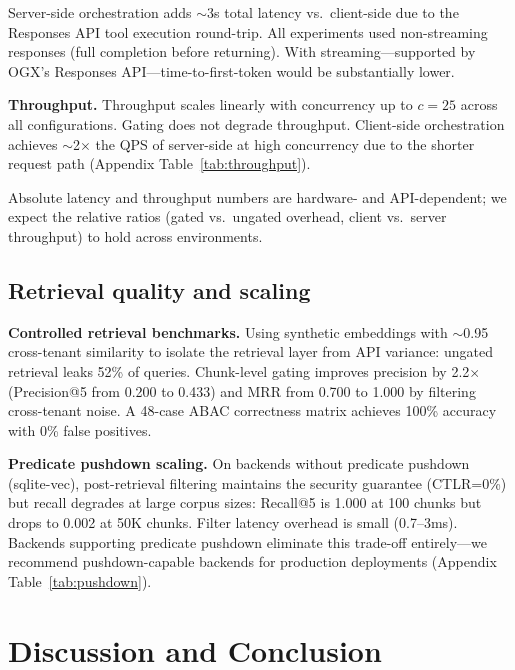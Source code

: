 \documentclass[sigconf]{acmart}
\begin{document}
Server-side orchestration adds ${\sim}$3s total latency vs.\ client-side due to the Responses API tool execution round-trip. All experiments used non-streaming responses (full completion before returning). With streaming---supported by OGX's Responses API---time-to-first-token would be substantially lower.

\textbf{Throughput.} Throughput scales linearly with concurrency up to $c{=}25$ across all configurations. Gating does not degrade throughput. Client-side orchestration achieves ${\sim}$2$\times$ the QPS of server-side at high concurrency due to the shorter request path (Appendix Table~\ref{tab:throughput}).

Absolute latency and throughput numbers are hardware- and API-dependent; we expect the relative ratios (gated vs.\ ungated overhead, client vs.\ server throughput) to hold across environments.

\subsection{Retrieval quality and scaling}

\textbf{Controlled retrieval benchmarks.} Using synthetic embeddings with ${\sim}$0.95 cross-tenant similarity to isolate the retrieval layer from API variance: ungated retrieval leaks 52\% of queries. Chunk-level gating improves precision by 2.2$\times$ (Precision@5 from 0.200 to 0.433) and MRR from 0.700 to 1.000 by filtering cross-tenant noise. A 48-case ABAC correctness matrix achieves 100\% accuracy with 0\% false positives.

\textbf{Predicate pushdown scaling.} On backends without predicate pushdown (sqlite-vec), post-retrieval filtering maintains the security guarantee (CTLR=0\%) but recall degrades at large corpus sizes: Recall@5 is 1.000 at 100 chunks but drops to 0.002 at 50K chunks. Filter latency overhead is small (0.7--3ms). Backends supporting predicate pushdown eliminate this trade-off entirely---we recommend pushdown-capable backends for production deployments (Appendix Table~\ref{tab:pushdown}).


\section{Discussion and Conclusion}
\label{sec:discussion}
\end{document}
